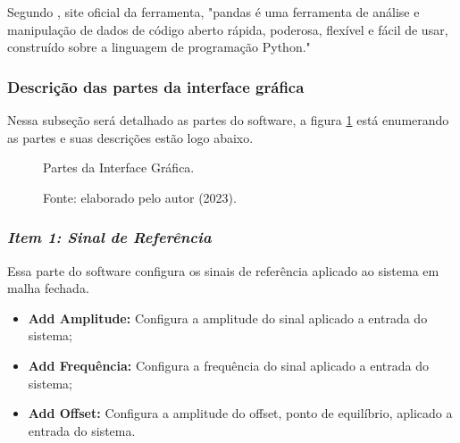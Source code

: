 Segundo \cite{pandas}, site oficial da ferramenta, "pandas é uma ferramenta de análise e manipulação de dados de código aberto rápida, poderosa, flexível e fácil de usar, construído sobre a linguagem de programação Python."


\subsubsection{Descrição das partes da interface gráfica}

Nessa subseção será detalhado as partes do software, a figura \ref{fig3:image_15} está enumerando as partes e suas descrições estão logo abaixo.

\begin{figure}[!h]
	\centering
	\caption{Partes da Interface Gráfica.}
	\caption*{Fonte: elaborado pelo autor (2023).}
	\label{fig3:image_15}
\end{figure}



\subsubsection*{\textit{Item 1: Sinal de Referência}}

Essa parte do software configura os sinais de referência aplicado ao sistema em malha fechada.


\begin{itemize}
        \setlength{\itemsep}{-2pt}
	\item  \textbf{Add Amplitude:} Configura a amplitude do sinal aplicado a entrada do sistema;
        \item  \textbf{Add Frequência:} Configura a frequência do sinal aplicado a entrada do sistema;
        \item  \textbf{Add Offset:} Configura a amplitude do offset, ponto de equilíbrio, aplicado a entrada do sistema.
\end{itemize}


